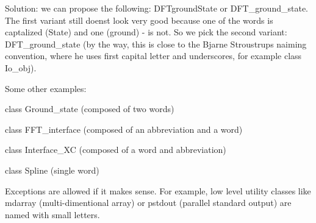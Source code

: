 Solution\+: we can propose the following\+: D\+F\+Tground\+State or D\+F\+T\+\_\+ground\+\_\+state. The first variant still doens\textquotesingle{}t look very good because one of the words is captalized (State) and one (ground) -\/ is not. So we pick the second variant\+: D\+F\+T\+\_\+ground\+\_\+state (by the way, this is close to the Bjarne Stroustrup\textquotesingle{}s naiming convention, where he uses first capital letter and underscores, for example class Io\+\_\+obj).

Some other examples\+:
\begin{DoxyItemize}
\item class Ground\+\_\+state (composed of two words)
\item class F\+F\+T\+\_\+interface (composed of an abbreviation and a word)
\item class Interface\+\_\+\+X\+C (composed of a word and abbreviation)
\item class Spline (single word)
\end{DoxyItemize}

Exceptions are allowed if it makes sense. For example, low level utility classes like \textquotesingle{}mdarray\textquotesingle{} (multi-\/dimentional array) or \textquotesingle{}pstdout\textquotesingle{} (parallel standard output) are named with small letters. 